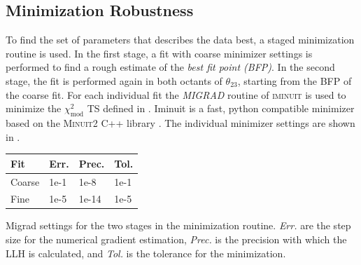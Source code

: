 \subsection{Minimization Robustness} 

To find the set of parameters that describes the data best, a staged minimization routine is used. In the first stage, a fit with coarse minimizer settings is performed to find a rough estimate of the \textit{best fit point (BFP)}. In the second stage, the fit is performed again in both octants of $\theta_{23}$, starting from the BFP of the coarse fit. For each individual fit the \textit{MIGRAD} routine of \textsc{iminuit}  is used to minimize the $\chi^2_{\mathrm{mod}}$ TS defined in . Iminuit is a fast, python compatible minimizer based on the \textsc{Minuit2} C++ library . The individual minimizer settings are shown in .

\begin{margintable}
    \small
        \begin{tabular}{ llll }
        \hline\hline
        \textbf{Fit} & \textbf{Err.} & \textbf{Prec.} & \textbf{Tol.} \\        
        \hline\hline    
        Coarse & 1e-1 & 1e-8 & 1e-1 \\
        Fine & 1e-5 & 1e-14 & 1e-5 \\    
        \hline
        \end{tabular}
    \caption[Staged minimization routine settings]{Migrad settings for the two stages in the minimization routine. \textit{Err.} are the step size for the numerical gradient estimation, \textit{Prec.} is the precision with which the LLH is calculated, and \textit{Tol.} is the tolerance for the minimization.}
\end{margintable}

